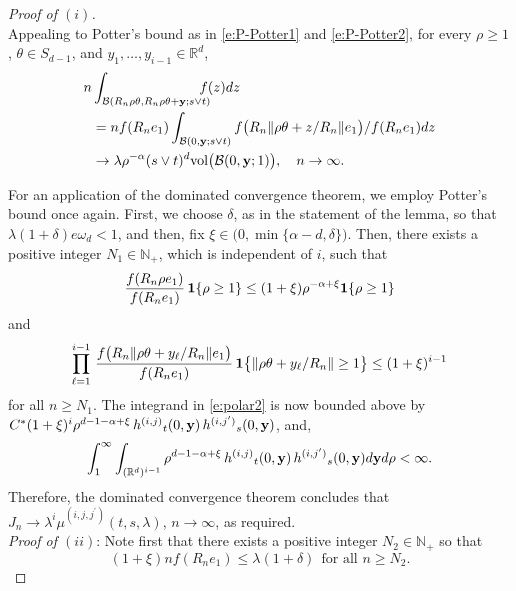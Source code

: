 \documentclass[11pt]{amsart}
\numberwithin{equation}{section}
\theoremstyle{plain}
\theoremstyle{definition}
\begin{document}
\begin{proof}[Proof of $(i)$]
$$$$
Appealing to Potter's bound as in \eqref{e:P-Potter1} and \eqref{e:P-Potter2}, for every $\rho \geq 1$, $\theta \in S_{d-1}$, and $y_1,\dots,y_{i-1} \in {{\mathbb R}}^d$,
\begin{align*}
n &\int_{{\mathcal B}(R_n\rho \theta,R_n\rho \theta + {{\bf y}}; s\vee t )} \hspace{-10pt} f(z)dz\\
&= nf(R_ne_1) \int_{{\mathcal B}(0,{{\bf y}}; s\vee t)} f \bigl( R_n \| \rho \theta + z /R_n \|e_1 \bigr)/f(R_ne_1) dz \\
&\to \lambda \rho^{-\alpha} (s\vee t)^d \text{vol}\bigl( {\mathcal B}(0,{{\bf y}}; 1) \bigr), \ \ \ n \to\infty.
\end{align*}

For an application of the dominated convergence theorem, we employ Potter's bound once again. First, we choose $\delta$, as in the statement of the lemma, so that $\lambda (1+\delta) e\omega_d < 1$, and then, fix $\xi \in \bigl( 0,\min \{ \alpha-d,  \delta \} \bigr)$. Then, there exists a positive integer $N_1 \in {{\mathbb N}}_+$, which is independent of $i$, such that
\begin{equation}  \label{e:potter1}
\frac{f(R_n\rho e_1)}{f(R_ne_1)}\, {{\bf 1}} \{  \rho \geq 1\} \leq (1+\xi) \rho^{-\alpha +\xi}  {{\bf 1}} \{  \rho \geq 1\}
\end{equation}
and 
\begin{equation}  \label{e:potter2}
\prod_{\ell = 1}^{i-1}\, \frac{f \bigl( R_n \| \rho \theta + y_\ell /R_n \|e_1 \bigr)}{f(R_ne_1)}\, {{\bf 1}} \bigl\{ \| \rho \theta + y_\ell /R_n \| \geq 1 \bigr\} \leq (1+\xi)^{i-1}
\end{equation}
for all $n \geq N_1$. The integrand in \eqref{e:polar2} is now bounded above by $C^* (1+\xi)^i \rho^{d-1-\alpha+\xi}\, {h^{(i,j)}}_t(0,{{\bf y}})\, {h^{(i,{j^{\prime}})}}_s(0,{{\bf y}})$, and,
$$
\int_1^{\infty} \int_{({{\mathbb R}}^d)^{i-1}} \rho^{d-1-\alpha +\xi}\, {h^{(i,j)}}_t(0,{{\bf y}})\, {h^{(i,{j^{\prime}})}}_s(0,{{\bf y}}) d{{\bf y}} d\rho <\infty.
$$
Therefore, the dominated convergence theorem concludes that $J_n \to \lambda^i {\mu^{(i,j,{j^{\prime}})}}(t,s,\lambda)$, $n\to\infty$, as required. \\
\textit{Proof of $(ii)$}:
Note first that there exists a positive integer $N_2 \in {{\mathbb N}}_+$ so that
\begin{equation}  \label{e:upper.lambda}
(1+\xi) nf(R_ne_1) \leq \lambda (1+\delta) \ \ \text{for all } n\geq N_2.
\end{equation}

\end{proof}
\end{document}
